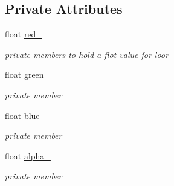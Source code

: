 \subsection*{Private Attributes}
\begin{DoxyCompactItemize}
\item 
float \hyperlink{classimage__tools_1_1ColorData_a78160b930d95c4ece6913717de69d228}{red\+\_\+}\hypertarget{classimage__tools_1_1ColorData_a78160b930d95c4ece6913717de69d228}{}\label{classimage__tools_1_1ColorData_a78160b930d95c4ece6913717de69d228}

\begin{DoxyCompactList}\small\item\em private members to hold a flot value for loor \end{DoxyCompactList}\item 
float \hyperlink{classimage__tools_1_1ColorData_aabfb09bb331483211b5b023a6870ea86}{green\+\_\+}\hypertarget{classimage__tools_1_1ColorData_aabfb09bb331483211b5b023a6870ea86}{}\label{classimage__tools_1_1ColorData_aabfb09bb331483211b5b023a6870ea86}

\begin{DoxyCompactList}\small\item\em private member \end{DoxyCompactList}\item 
float \hyperlink{classimage__tools_1_1ColorData_a8d44e8cd0701a5cd6fbee7fdb4d01309}{blue\+\_\+}\hypertarget{classimage__tools_1_1ColorData_a8d44e8cd0701a5cd6fbee7fdb4d01309}{}\label{classimage__tools_1_1ColorData_a8d44e8cd0701a5cd6fbee7fdb4d01309}

\begin{DoxyCompactList}\small\item\em private member \end{DoxyCompactList}\item 
float \hyperlink{classimage__tools_1_1ColorData_a7bc7d145ee17270baa2d17a03fa17c1e}{alpha\+\_\+}\hypertarget{classimage__tools_1_1ColorData_a7bc7d145ee17270baa2d17a03fa17c1e}{}\label{classimage__tools_1_1ColorData_a7bc7d145ee17270baa2d17a03fa17c1e}

\begin{DoxyCompactList}\small\item\em private member \end{DoxyCompactList}\end{DoxyCompactItemize}
